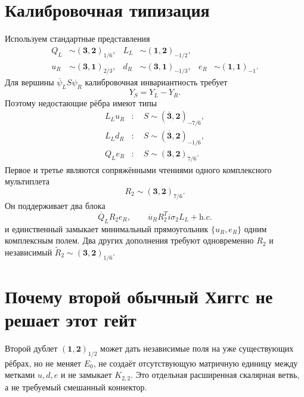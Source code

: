 \section{Калибровочная типизация}

Используем стандартные представления
\begin{align}
 Q_L&\sim(\mathbf3,\mathbf2)_{1/6},&
 L_L&\sim(\mathbf1,\mathbf2)_{-1/2},\nonumber\\
 u_R&\sim(\mathbf3,\mathbf1)_{2/3},&
 d_R&\sim(\mathbf3,\mathbf1)_{-1/3},&
 e_R&\sim(\mathbf1,\mathbf1)_{-1}.
\end{align}
Для вершины $\overline\psi_L S\psi_R$ калибровочная инвариантность требует
\begin{equation}
 Y_S=Y_L-Y_R.
 \label{eq:v7-scalar-hypercharge-rule}
\end{equation}
Поэтому недостающие рёбра имеют типы
\begin{align}
 L_Lu_R&:\quad S\sim(\overline{\mathbf3},\mathbf2)_{-7/6},\nonumber\\
 L_Ld_R&:\quad S\sim(\overline{\mathbf3},\mathbf2)_{-1/6},
 \label{eq:v7-missing-edge-scalars}\\
 Q_Le_R&:\quad S\sim(\mathbf3,\mathbf2)_{7/6}.\nonumber
\end{align}
Первое и третье являются сопряжёнными чтениями одного комплексного
мультиплета
\begin{equation}
 R_2\sim(\mathbf3,\mathbf2)_{7/6}.
 \label{eq:v7-r2-candidate}
\end{equation}
Он поддерживает два блока
\begin{equation}
 \overline Q_LR_2e_R,
 \qquad
 \overline u_RR_2^Ti\sigma_2L_L+\mathrm{h.c.}
 \label{eq:v7-r2-two-edges}
\end{equation}
и единственный замыкает минимальный прямоугольник $\{u_R,e_R\}$ одним
комплексным полем. Два других дополнения требуют одновременно $R_2$ и
независимый $\widetilde R_2\sim(\mathbf3,\mathbf2)_{1/6}$.

\section{Почему второй обычный Хиггс не решает этот гейт}

Второй дублет $(\mathbf1,\mathbf2)_{1/2}$ может дать независимые поля на
уже существующих рёбрах, но не меняет $E_0$, не создаёт отсутствующую
матричную единицу между метками $u,d,e$ и не замыкает $K_{2,2}$. Это
отдельная расширенная скалярная ветвь, а не требуемый смешанный коннектор.

